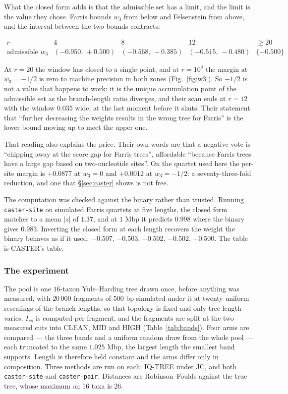 \documentclass[preprint,12pt,authoryear]{elsarticle}
\newcommand{\Iss}{I_{ss}}
\theoremstyle{definition}
\theoremstyle{remark}
\begin{document}
What the closed form adds is that the admissible set has a limit, and the
limit is the value they chose. Farris bounds $w_3$ from below and
Felsenstein from above, and the interval between the two bounds contracts:

\begin{equation}
\begin{array}{l|cccc}
r & 4 & 8 & 12 & \ge 20 \\ \hline
\text{admissible } w_3 & (-0.950,\,+0.500) & (-0.568,\,-0.385)
 & (-0.515,\,-0.480) & \{-0.500\}
\end{array}
\end{equation}

At $r=20$ the window has closed to a single point, and at $r=10^4$ the
margin at $w_3=-1/2$ is zero to machine precision in both zones
(Fig.~\ref{fig:w3}). So $-1/2$
is not a value that happens to work: it is the unique accumulation point of
the admissible set as the branch-length ratio diverges, and their scan ends
at $r=12$ with the window $0.035$ wide, at the last moment before it shuts.
Their statement that ``further decreasing the weights results in the wrong
tree for Farris'' is the lower bound moving up to meet the upper one.

That reading also explains the price. Their own words are that a negative
vote is ``chipping away at the score gap for Farris trees'', affordable
``because Farris trees have a large gap based on two-nucleotide sites''. On
the quartet used here the per-site margin is $+0.0877$ at $w_3=0$ and
$+0.0012$ at $w_3=-1/2$: a seventy-three-fold reduction, and one that
\S\ref{sec:caster} shows is not free.

The computation was checked against the binary rather than trusted. Running
\texttt{caster-site} on simulated Farris quartets at five lengths, the
closed form matches to a mean $|z|$ of $1.37$, and at $1$ Mbp it predicts
$0.998$ where the binary gives $0.983$. Inverting the closed form at each
length recovers the weight the binary behaves as if it used:
$-0.507$, $-0.503$, $-0.502$, $-0.502$, $-0.500$. The table is CASTER's
table.

\subsubsection{The experiment}
\label{sec:genome-exp}

The pool is one $16$-taxon Yule--Harding tree drawn once, before anything was
measured, with $20\,000$ fragments of $500$ bp simulated under it at twenty
uniform rescalings of the branch lengths, so that topology is fixed and only
tree length varies. $\Iss$ is computed per fragment, and the fragments are
split at the two measured cuts into CLEAN, MID and HIGH
(Table~\ref{tab:bands}). Four arms are compared --- the three bands and a
uniform random draw from the whole pool --- each truncated to the same
$1.025$ Mbp, the largest length the smallest band supports. Length is
therefore held constant and the arms differ only in composition. Three
methods are run on each: IQ-TREE under JC, and both \texttt{caster-site} and
\texttt{caster-pair}. Distances are Robinson--Foulds against the true tree,
whose maximum on $16$ taxa is $26$.
\end{document}
